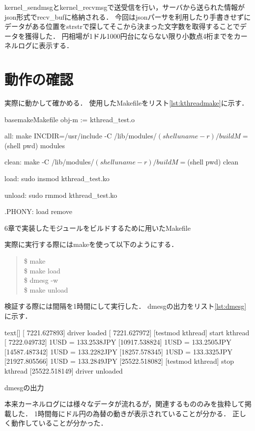 kernel\_sendmsgとkernel\_recvmsgで送受信を行い，サーバから送られた情報がjson形式でrecv\_bufに格納される．
今回はjsonパーサを利用したり手書きせずにデータがある位置をstrstrで探してそこから決まった文字数を取得することでデータを獲得した．
円相場が1ドル1000円台にならない限り小数点4桁までをカーネルログに表示する．


\section{動作の確認}
実際に動かして確かめる．
使用したMakefileをリスト\ref{lst:kthreadmake}に示す．
\begin{longlisting}
\begin{myminted}{basemake}{Makefile}
obj-m := kthread_test.o

all:
	make INCDIR=/usr/include -C /lib/modules/$(shell uname -r)/build M=$(shell pwd) modules

clean:
	make -C /lib/modules/$(shell uname -r)/build M=$(shell pwd) clean

load:
	sudo insmod kthread_test.ko

unload:
	sudo rmmod kthread_test.ko

.PHONY: load remove
\end{myminted}
\caption{6章で実装したモジュールをビルドするために用いたMakefile}
\label{lst:kthreadmake}
\end{longlisting}

実際に実行する際にはmakeを使って以下のようにする．
\begin{quote}
\$ make \\
\$ make load \\
\$ dmesg -w \\
\$ make unload
\end{quote}

検証する際には間隔を1時間にして実行した．
dmesgの出力をリスト\ref{lst:dmesg}に示す．
\begin{longlisting}
\begin{myminted}{text}[]
[ 7221.627893] driver loaded
[ 7221.627972] [testmod kthread] start kthread
[ 7222.049732] 1USD = 133.2538JPY
[10917.538824] 1USD = 133.2505JPY
[14587.487342] 1USD = 133.2282JPY
[18257.578345] 1USD = 133.3325JPY
[21927.805566] 1USD = 133.2849JPY
[25522.518082] [testmod kthread] stop kthread
[25522.518149] driver unloaded
\end{myminted}
\caption{dmesgの出力}
\label{lst:dmesg}
\end{longlisting}

本来カーネルログには様々なデータが流れるが，関連するもののみを抜粋して掲載した．
1時間毎にドル円の為替の動きが表示されていることが分かる．
正しく動作していることが分かった．
